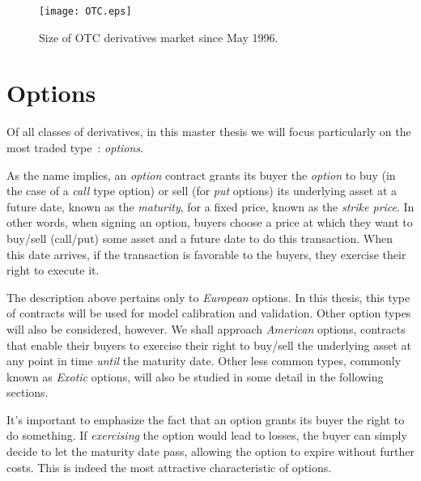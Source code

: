 \begin{figure}[!htb]
    \centering
      \texttt{[image: OTC.eps]}
      \caption{Size of OTC derivatives market since May 1996.}\label{fig:OTC}
    \end{figure}

\section{Options}
\label{section:options}
Of all classes of derivatives, in this master thesis we will focus particularly on the most traded type~\cite{Hull}: \emph{options}.

As the name implies, an \emph{option} contract grants its buyer the \emph{option} to buy (in the case of a \emph{call} type option) or sell (for \emph{put} options) its underlying asset at a future date, known as the \emph{maturity}, for a fixed price, known as the \emph{strike price}.
In other words, when signing an option, buyers choose a price at which they want to buy/sell (call/put) some asset and a future date to do this transaction. When this date arrives, if the transaction is favorable to the buyers, they exercise their right to execute it.

The description above pertains only to \emph{European} options. In this thesis, this type of contracts will be used for model calibration and validation. Other option types will also be considered, however. We shall approach \emph{American} options, contracts that enable their buyers to exercise their right to buy/sell the underlying asset at any point in time \emph{until} the maturity date. Other less common types, commonly known as \emph{Exotic} options, will also be studied in some detail in the following sections.


It's important to emphasize the fact that an option grants its buyer the right to do something. If \emph{exercising} the option would lead to losses, the buyer can simply decide to let the maturity date pass, allowing the option to expire without further costs. This is indeed the most attractive characteristic of options.


\iffalse
